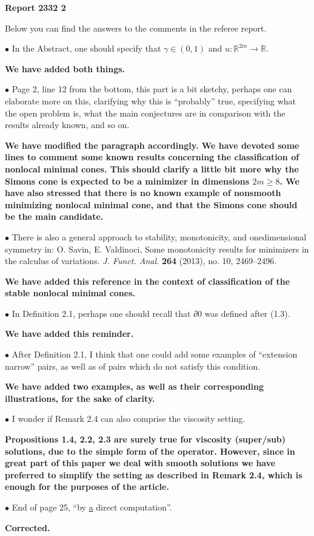 \documentclass[]{report}
\title{}
\author{}
\begin{document}
	
	\begin{center}
		\textbf{	Report 2332 2}
	\end{center}
	Below you can find the answers to the comments in the referee report.
	
	\medskip
$\bullet$  In the Abstract, one should specify that $\gamma \in (0, 1)$ and $u : \mathbb{R}^{2m} \to \mathbb{R}$.

\medskip
\textbf{We have added both things.}
\bigskip

$\bullet$  Page 2, line 12 from the bottom, this part is a bit sketchy, perhaps one can elaborate more on this, clarifying why this is ``probably'' true, specifying what the open problem is, what the main conjectures are in comparison with the results already known, and so on.

\medskip
\textbf{We have modified the paragraph accordingly. We have devoted some lines to comment some known results concerning the classification of nonlocal minimal cones. This should clarify a little bit more why the Simons cone is expected to be a minimizer in dimensions $2m\geq8$. We have also stressed that there is no known example of nonsmooth minimizing nonlocal minimal cone, and that the Simons cone should be the main candidate.}
\bigskip


$\bullet$  There is also a general approach to stability, monotonicity, and onedimensional symmetry in: O. Savin, E. Valdinoci, Some monotonicity results for minimizers in the calculus of variations. \textit{J. Funct. Anal.  }\textbf{264} (2013), no. 10, 2469–2496.

\medskip
\textbf{We have added this reference in the context of classification of the stable  nonlocal minimal cones.}
\bigskip





$\bullet$  In Definition 2.1, perhaps one should recall that ∂0 was defined after (1.3).

\medskip
\textbf{We have added this reminder.}
\bigskip




$\bullet$  After Definition 2.1, I think that one could add some examples of “extension narrow” pairs, as well as of pairs which do not satisfy this condition.

\medskip
\textbf{We have added two examples, as well as their corresponding illustrations, for the sake of clarity.}
\bigskip




$\bullet$  I wonder if Remark 2.4 can also comprise the viscosity setting.

\medskip
\textbf{ Propositions 1.4, 2.2, 2.3 are surely true for viscosity (super/sub) solutions, due to the simple form of the operator. However, since in great part of this paper we deal with smooth solutions we have preferred to simplify the setting as described in  Remark 2.4, which is enough for the purposes of the article. }
\bigskip


$\bullet$  End of page 25, ``by \underline{a} direct computation''.

\medskip
\textbf{Corrected.}
\bigskip
\end{document}
